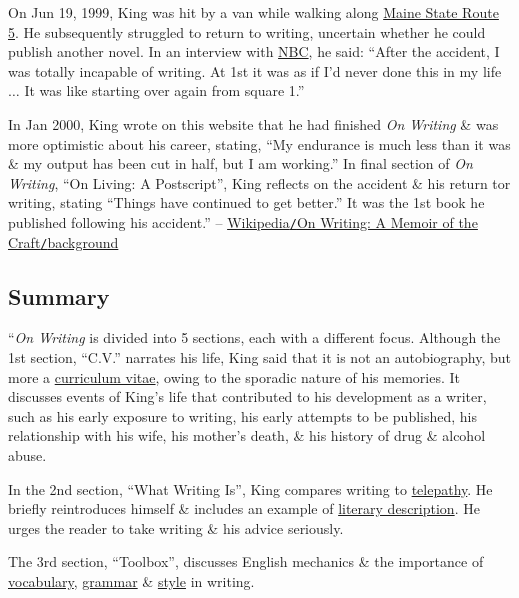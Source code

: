 \documentclass[oneside]{book}
\numberwithin{equation}{section}
\begin{document}
On Jun 19, 1999, King was hit by a van while walking along \href{https://en.wikipedia.org/wiki/Maine_State_Route_5}{Maine State Route 5}. He subsequently struggled to return to writing, uncertain whether he could publish another novel. In an interview with \href{https://en.wikipedia.org/wiki/NBC}{NBC}, he said: ``After the accident, I was totally incapable of writing. At 1st it was as if I'd never done this in my life $\ldots$ It was like starting over again from square 1.''

In Jan 2000, King wrote on this website that he had finished \textit{On Writing} \& was more optimistic about his career, stating, ``My endurance is much less than it was \& my output has been cut in half, but I am working.'' In final section of \textit{On Writing}, ``On Living: A Postscript'', King reflects on the accident \& his return tor writing, stating ``Things have continued to get better.'' It was the 1st book he published following his accident.'' -- \href{https://en.wikipedia.org/wiki/On_Writing:_A_Memoir_of_the_Craft#Background}{Wikipedia\texttt{/}On Writing: A Memoir of the Craft\texttt{/}background}

\subsection{Summary}
``\textit{On Writing} is divided into 5 sections, each with a different focus. Although the 1st section, ``C.V.'' narrates his life, King said that it is not an autobiography, but more a \href{https://en.wikipedia.org/wiki/Curriculum_vitae}{curriculum vitae}, owing to the sporadic nature of his memories. It discusses events of King's life that contributed to his development as a writer, such as his early exposure to writing, his early attempts to be published, his relationship with his wife, his mother's death, \& his history of drug \& alcohol abuse.

In the 2nd section, ``What Writing Is'', King compares writing to \href{https://en.wikipedia.org/wiki/Telepathy}{telepathy}. He briefly reintroduces himself \& includes an example of \href{https://en.wikipedia.org/wiki/Description}{literary description}. He urges the reader to take writing \& his advice seriously.

The 3rd section, ``Toolbox'', discusses English mechanics \& the importance of \href{https://en.wikipedia.org/wiki/Vocabulary}{vocabulary}, \href{https://en.wikipedia.org/wiki/Grammar}{grammar} \& \href{https://en.wikipedia.org/wiki/Style_(literature)}{style} in writing.
\end{document}
